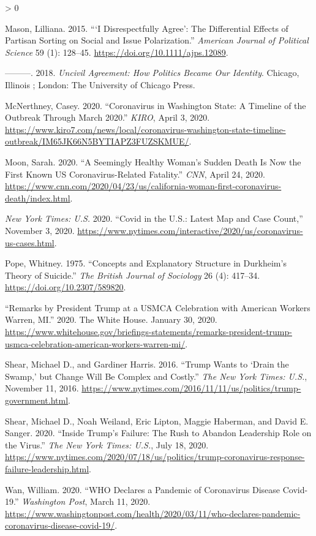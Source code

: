 \documentclass[
  12pt,
]{article}
\newlength{\cslhangindent}
\newenvironment{CSLReferences}[2] %
 {%
  \setlength{\parindent}{0pt}
  \ifodd #1 \everypar{\setlength{\hangindent}{\cslhangindent}}\ignorespaces\fi
  \ifnum #2 > 0
  \setlength{\parskip}{#2\baselineskip}
  \fi
 }%
 {}
\begin{document}
\begin{CSLReferences}{1}{0}
\leavevmode\hypertarget{ref-Mason2015}{}%
Mason, Lilliana. 2015. {``{`{I Disrespectfully Agree}'}: {The Differential Effects} of {Partisan Sorting} on {Social} and {Issue Polarization}.''} \emph{American Journal of Political Science} 59 (1): 128--45. \url{https://doi.org/10.1111/ajps.12089}.

\leavevmode\hypertarget{ref-Mason2018}{}%
---------. 2018. \emph{Uncivil Agreement: How Politics Became Our Identity}. {Chicago, Illinois ; London}: {The University of Chicago Press}.

\leavevmode\hypertarget{ref-McNerthney2020}{}%
McNerthney, Casey. 2020. {``Coronavirus in {Washington} State: {A} Timeline of the Outbreak Through {March} 2020.''} \emph{KIRO}, April 3, 2020. \url{https://www.kiro7.com/news/local/coronavirus-washington-state-timeline-outbreak/IM65JK66N5BYTIAPZ3FUZSKMUE/}.

\leavevmode\hypertarget{ref-Moon2020}{}%
Moon, Sarah. 2020. {``A Seemingly Healthy Woman's Sudden Death Is Now the First Known {US} Coronavirus-Related Fatality.''} \emph{CNN}, April 24, 2020. \url{https://www.cnn.com/2020/04/23/us/california-woman-first-coronavirus-death/index.html}.

\leavevmode\hypertarget{ref-nyt2020}{}%
\emph{New York Times: U.S.} 2020. {``Covid in the {U}.{S}.: {Latest Map} and {Case Count},''} November 3, 2020. \url{https://www.nytimes.com/interactive/2020/us/coronavirus-us-cases.html}.

\leavevmode\hypertarget{ref-Pope1975}{}%
Pope, Whitney. 1975. {``Concepts and {Explanatory Structure} in {Durkheim}'s {Theory} of {Suicide}.''} \emph{The British Journal of Sociology} 26 (4): 417--34. \url{https://doi.org/10.2307/589820}.

\leavevmode\hypertarget{ref-whitehouse2020}{}%
{``Remarks by {President Trump} at a {USMCA Celebration} with {American Workers} \textbar{} {Warren}, {MI}.''} 2020. {The White House}. January 30, 2020. \url{https://www.whitehouse.gov/briefings-statements/remarks-president-trump-usmca-celebration-american-workers-warren-mi/}.

\leavevmode\hypertarget{ref-Shear2016}{}%
Shear, Michael D., and Gardiner Harris. 2016. {``Trump {Wants} to {`{Drain} the {Swamp},'} but {Change Will Be Complex} and {Costly}.''} \emph{The New York Times: U.S.}, November 11, 2016. \url{https://www.nytimes.com/2016/11/11/us/politics/trump-government.html}.

\leavevmode\hypertarget{ref-Shear2020}{}%
Shear, Michael D., Noah Weiland, Eric Lipton, Maggie Haberman, and David E. Sanger. 2020. {``Inside {Trump}'s {Failure}: {The Rush} to {Abandon Leadership Role} on the {Virus}.''} \emph{The New York Times: U.S.}, July 18, 2020. \url{https://www.nytimes.com/2020/07/18/us/politics/trump-coronavirus-response-failure-leadership.html}.

\leavevmode\hypertarget{ref-Wan2020}{}%
Wan, William. 2020. {``{WHO} Declares a Pandemic of Coronavirus Disease Covid-19.''} \emph{Washington Post}, March 11, 2020. \url{https://www.washingtonpost.com/health/2020/03/11/who-declares-pandemic-coronavirus-disease-covid-19/}.

\end{CSLReferences}
\end{document}
